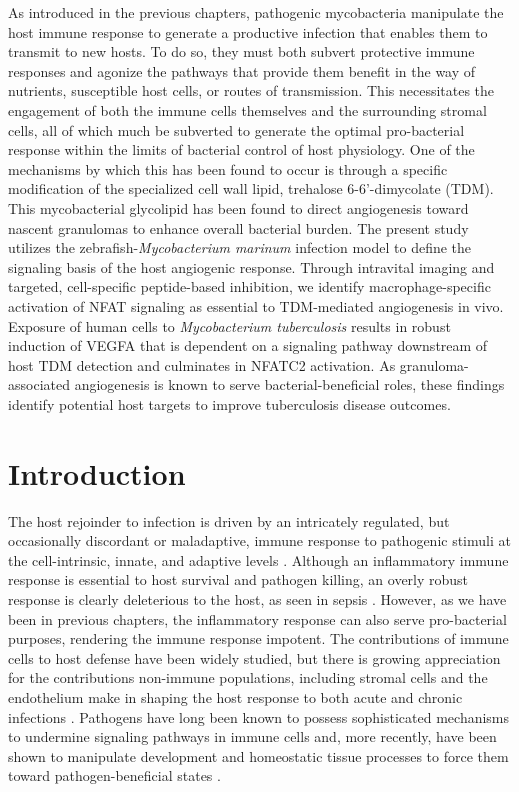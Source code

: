 As introduced in the previous chapters, pathogenic mycobacteria manipulate the host immune response to generate a productive infection that enables them to transmit to new hosts. To do so, they must both subvert protective immune responses and agonize the pathways that provide them benefit in the way of nutrients, susceptible host cells, or routes of transmission. This necessitates the engagement of both the immune cells themselves and the surrounding stromal cells, all of which much be subverted to generate the optimal pro\hyp{}bacterial response within the limits of bacterial control of host physiology. One of the mechanisms by which this has been found to occur is through a specific modification of the specialized cell wall lipid, trehalose 6\hyp{}6'\hyp{}dimycolate (TDM). This mycobacterial glycolipid has been found to direct angiogenesis toward nascent granulomas to enhance overall bacterial burden. The present study utilizes the zebrafish\hyp{}\textit{Mycobacterium marinum} infection model to define the signaling basis of the host angiogenic response. Through intravital imaging and targeted, cell\hyp{}specific peptide\hyp{}based inhibition, we identify macrophage\hyp{}specific activation of NFAT signaling as essential to TDM\hyp{}mediated angiogenesis in vivo.  Exposure of human cells to \textit{Mycobacterium tuberculosis} results in robust induction of VEGFA that is dependent on a signaling pathway downstream of host TDM detection and culminates in NFATC2 activation. As granuloma\hyp{}associated angiogenesis is known to serve bacterial\hyp{}beneficial roles, these findings identify potential host targets to improve tuberculosis disease outcomes.

\section{Introduction}\label{pap:intro}

The host rejoinder to infection is driven by an intricately regulated, but occasionally discordant or maladaptive, immune response to pathogenic stimuli at the cell\hyp{}intrinsic, innate, and adaptive levels \citep{Iwasaki2010, Finlay2006, Haldar2015, MacMicking2004, MacMicking2012, Kim2012, Wilburn2022}. Although an inflammatory immune response is essential to host survival and pathogen killing, an overly robust response is clearly deleterious to the host, as seen in sepsis \citep{Finethy2020, Casadevall2003}. However, as we have been in previous chapters, the inflammatory response can also serve pro\hyp{}bacterial purposes, rendering the immune response impotent. The contributions of immune cells to host defense have been widely studied, but there is growing appreciation for the contributions non\hyp{}immune populations, including stromal cells and the endothelium \citep{Honan2021, Worrell2021, Amersfoort2022, Honan2021} make in shaping the host response to both acute and chronic infections \citep{Mueller2009, Randow2013, Krishnamurty2020}. Pathogens have long been known to possess sophisticated mechanisms to undermine signaling pathways in immune cells and, more recently, have been shown to manipulate development and homeostatic tissue processes to force them toward pathogen\hyp{}beneficial states \citep{Menzies1998, Guichard2013}.

